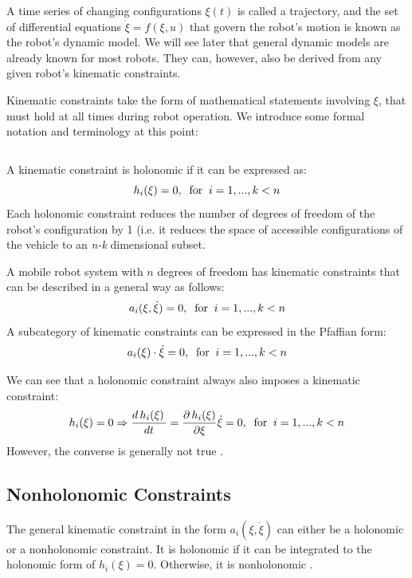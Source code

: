 \documentclass[twoside]{article}
\begin{document}
A time series of changing configurations $ \xi(t) $ is called a trajectory, and the set of differential equations $ \dot{\xi} = f(\xi,u) $ that govern the robot's motion is known as the robot's dynamic model. We will see later that general dynamic models are already known for most robots. They can, however, also be derived from any given robot's kinematic constraints.

Kinematic constraints take the form of mathematical statements involving $\xi$, that must hold at all times during robot operation. We introduce some formal notation and terminology at this point:

$$
$$

\begin{frm-def}
A kinematic constraint is holonomic if it can be expressed as:
$$
h_i(\xi) = 0,\;\;\textup{for}\;\;i = 1,...,k < n
$$
Each holonomic constraint reduces the number of degrees of freedom of the robot's configuration by 1 (i.e. it reduces the space of accessible configurations of the vehicle to an \textit{n-k} dimensional subset.
\end{frm-def}

\newpage

\begin{frm-def}
A mobile robot system with $n$ degrees of freedom has kinematic constraints that can be described in a general way as follows:
$$
a_i (\xi, \dot{\xi})=0,\;\;\textup{for}\;\;i = 1,...,k < n
$$
A subcategory of kinematic constraints can be expressed in the Pfaffian form:
$$
a_i(\xi) \cdot \dot{\xi} = 0,\;\;\textup{for}\;\;i = 1,...,k < n
$$
\end{frm-def}

We can see that a holonomic constraint always also imposes a kinematic constraint:
$$
h_i(\xi) = 0 \Rightarrow \frac{d\,h_i(\xi)\, }{dt} = \frac{\partial\,h_i(\xi)}{\partial \xi} \dot{\xi} = 0,\;\;\textup{for}\;\;i = 1,...,k < n
$$
However, the converse is generally not true \cite{ssvo}.

\subsection*{Nonholonomic Constraints}

The general kinematic constraint in the form $ a_i (\xi, \dot{\xi}) $ can either be a holonomic or a nonholonomic constraint. It is holonomic if it can be integrated to the holonomic form of $ h_i(\xi) = 0 $. Otherwise, it is nonholonomic \cite{ssvo}.
\end{document}
